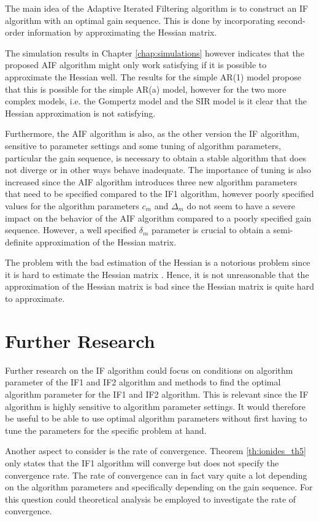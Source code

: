 \documentclass[twoside,openright]{report}
\begin{document}
The main idea of the Adaptive Iterated Filtering algorithm is to construct an IF algorithm with an optimal gain sequence. This is done by incorporating second-order information by approximating the Hessian matrix. 

The simulation results in Chapter \ref{chap:simulations} however indicates that the proposed AIF algorithm might only work satisfying if it is possible to approximate the Hessian well. The results for the simple AR(1) model propose that this is possible for the simple AR(a) model, however for the two more complex models, i.e. the Gompertz model and the SIR model is it clear that the Hessian approximation is not satisfying. 

Furthermore, the AIF algorithm is also, as the other version the IF algorithm, sensitive to parameter settings and some tuning of algorithm parameters, particular the gain sequence, is necessary to obtain a stable algorithm that does not diverge or in other ways behave inadequate. The importance of tuning is also increased since the AIF algorithm introduces three new algorithm parameters that need to be specified compared to the IF1 algorithm, however poorly specified values for the algorithm parameters $c_m$ and $\Delta_m$ do not seem to have a severe impact on the behavior of the AIF algorithm compared to a poorly specified gain sequence. However, a well specified $\delta_m$ parameter is crucial to obtain a semi-definite approximation of the Hessian matrix. 
 
The problem with the bad estimation of the Hessian is a notorious problem since it is hard to estimate the Hessian matrix \cite{spall2005introduction}. Hence, it is not unreasonable that the approximation of the Hessian matrix is bad since the Hessian matrix is quite hard to approximate.      


\section{Further Research}

Further research on the IF algorithm could focus on conditions on algorithm parameter of the IF1 and IF2 algorithm and methods to find the optimal algorithm parameter for the IF1 and IF2 algorithm. This is relevant since the IF algorithm is highly sensitive to algorithm parameter settings. It would therefore be useful to be able to use optimal algorithm parameters without first having to tune the parameters for the specific problem at hand. 

Another aspect to consider is the rate of convergence. Theorem \ref{th:ionides_th5} only states that the IF1 algorithm will converge but does not specify the convergence rate. The rate of convergence can in fact vary quite a lot depending on the algorithm parameters and specifically depending on the gain sequence. For this question could theoretical analysis  be employed to investigate the rate of convergence.
\end{document}
